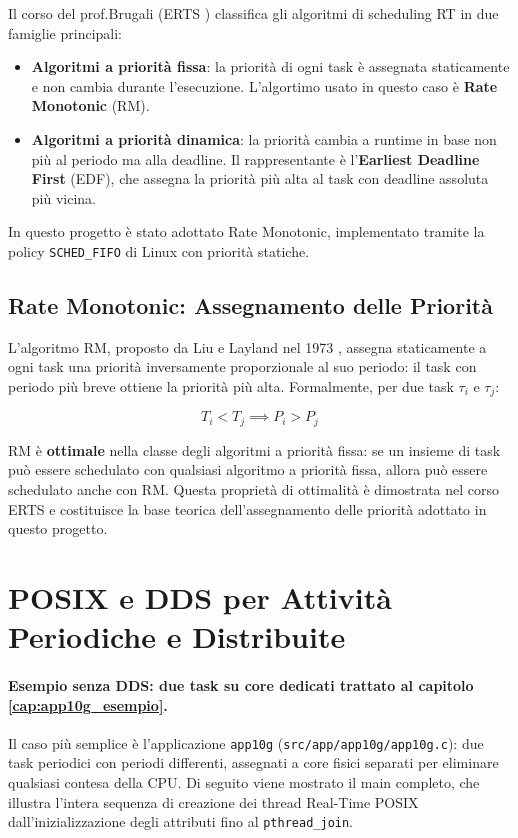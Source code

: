 Il corso del prof.Brugali (ERTS \cite{brugali_erts_2025}) classifica gli algoritmi di scheduling RT in due famiglie principali:

\begin{itemize}
	\item \textbf{Algoritmi a priorità fissa}: la priorità di ogni task è assegnata staticamente e non cambia durante l'esecuzione. L'algortimo usato in questo caso è \textbf{Rate Monotonic} (RM).
	\item \textbf{Algoritmi a priorità dinamica}: la priorità cambia a runtime in base non più al periodo ma alla deadline. Il rappresentante è l'\textbf{Earliest Deadline First} (EDF), che assegna la priorità più alta al task con deadline assoluta più vicina.
\end{itemize}

In questo progetto è stato adottato Rate Monotonic, implementato tramite la policy \texttt{SCHED\_FIFO} di Linux con priorità statiche.

\subsection{Rate Monotonic: Assegnamento delle Priorità}

L'algoritmo RM, proposto da Liu e Layland nel 1973 \cite{brugali_erts_2025}, assegna staticamente a ogni task una priorità inversamente proporzionale al suo periodo: il task con periodo più breve ottiene la priorità più alta. Formalmente, per due task $\tau_i$ e $\tau_j$:

\begin{equation}
	T_i < T_j \implies P_i > P_j
\end{equation}

RM è \textbf{ottimale} nella classe degli algoritmi a priorità fissa: se un insieme di task può essere schedulato con qualsiasi algoritmo a priorità fissa, allora può essere schedulato anche con RM. Questa proprietà di ottimalità è dimostrata nel corso ERTS e costituisce la base teorica dell'assegnamento delle priorità adottato in questo progetto.


\section{POSIX e DDS per Attività Periodiche e Distribuite}
\label{sec:posix_dds}



\paragraph{Esempio senza DDS: due task su core dedicati trattato al capitolo \ref{cap:app10g_esempio}.}
Il caso più semplice è l'applicazione \texttt{app10g} (\texttt{src/app/app10g/app10g.c}): due task periodici con periodi differenti, assegnati a core fisici separati per eliminare qualsiasi contesa della CPU. Di seguito viene mostrato il main completo, che illustra l'intera sequenza di creazione dei thread Real-Time POSIX dall'inizializzazione degli attributi fino al \texttt{pthread\_join}.


